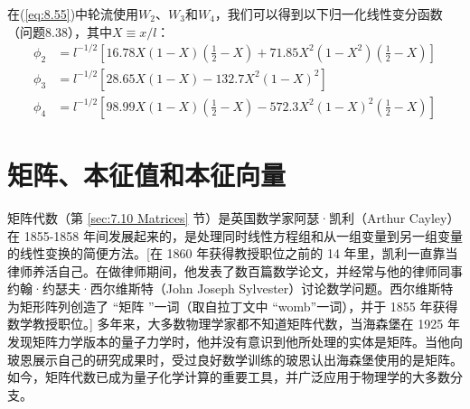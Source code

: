 \begin{examplebox}
        在(\ref{eq:8.55})中轮流使用$W_2$、$W_3$和$W_4$，我们可以得到以下归一化线性变分函数（问题8.38），其中$X \equiv x/l$：
        \begin{equation}
            \begin{aligned}
                \phi_2 &= l^{-1/2}\left[16.78X\left(1-X\right)\left(\frac{1}{2} - X\right) + 71.85X^2\left(1-X^2\right)\left(\frac{1}{2} - X\right)\right] \\
                \phi_3 &= l^{-1/2}\left[28.65X\left(1-X\right) - 132.7X^2\left(1-X\right)^2\right] \\
                \phi_4 &= l^{-1/2}\left[98.99X\left(1-X\right)\left(\frac{1}{2} - X\right) - 572.3X^2\left(1-X\right)^2\left(\frac{1}{2} - X\right)\right]
            \end{aligned}
            \label{eq:8.75}
        \end{equation}
    \end{examplebox}

\section{矩阵、本征值和本征向量}
\label{sec:8.6 Matrices, Eigenvalues, and Eigenvectors}
    矩阵代数（第 \ref{sec:7.10 Matrices} 节）是英国数学家阿瑟·凯利（Arthur Cayley）在 1855-1858 年间发展起来的，是处理同时线性方程组和从一组变量到另一组变量的线性变换的简便方法。[在 1860 年获得教授职位之前的 14 年里，凯利一直靠当律师养活自己。在做律师期间，他发表了数百篇数学论文，并经常与他的律师同事约翰·约瑟夫·西尔维斯特（John Joseph Sylvester）讨论数学问题。西尔维斯特为矩形阵列创造了 “矩阵 ”一词（取自拉丁文中 “womb”一词），并于 1855 年获得数学教授职位。] 多年来，大多数物理学家都不知道矩阵代数，当海森堡在 1925 年发现矩阵力学版本的量子力学时，他并没有意识到他所处理的实体是矩阵。当他向玻恩展示自己的研究成果时，受过良好数学训练的玻恩认出海森堡使用的是矩阵。如今，矩阵代数已成为量子化学计算的重要工具，并广泛应用于物理学的大多数分支。


